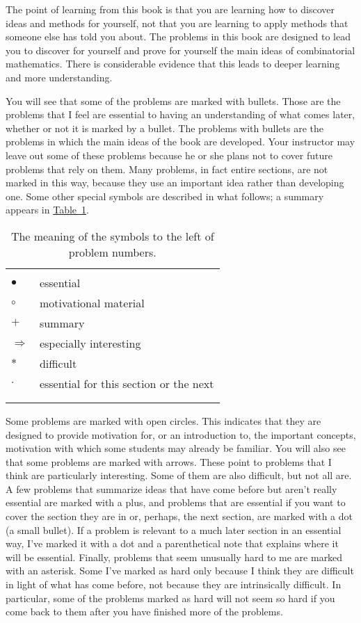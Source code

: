 \documentclass[10pt,]{book}
\theoremstyle{plain}
\theoremstyle{definition}
\numberwithin{equation}{chapter}
\newcommand{\hrulethin}  {\noalign{\hrule height 0.04em}}
\newcommand{\importantarrow}{$\Rightarrow$}
\begin{document}
\par
The point of learning from this book is that you are learning how to discover ideas and methods for yourself, not that you are learning to apply methods that someone else has told you about. The problems in this book are designed to lead you to discover for yourself and prove for yourself the main ideas of combinatorial mathematics.  There is considerable evidence that this leads to deeper learning and more understanding.%
\par
You will see that some of the problems are marked with bullets. Those are the problems that I feel are essential to having an understanding of what comes later, whether or not it is marked by a bullet. The problems with bullets are the problems in which the main ideas of the book are developed. Your instructor may leave out some of these problems because he or she plans not to cover future problems that rely on them. Many problems, in fact entire sections, are not marked in this way, because they use an important idea rather than developing one. Some other special symbols are described in what follows; a summary appears in \hyperref[tab_prob-symbs-pref]{Table~\ref{tab_prob-symbs-pref}}.%
\begin{table}
\centering
\begin{tabular}{ll}
&\tabularnewline\hrulethin
\(\bullet\)&essential\tabularnewline[0pt]
\(\circ\)&motivational material\tabularnewline[0pt]
\(+\)&summary\tabularnewline[0pt]
\importantarrow&especially interesting\tabularnewline[0pt]
\(*\)&difficult\tabularnewline[0pt]
\(\cdot\)&essential for this section or the next\tabularnewline[0pt]
&\tabularnewline\hrulethin
\end{tabular}
\caption{The meaning of the symbols to the left of problem numbers.\label{tab_prob-symbs-pref}}
\end{table}
Some problems are marked with open circles. This indicates that they are designed to provide motivation for, or an introduction to, the important concepts, motivation with which some students may already be familiar. You will also see that some problems are marked with arrows. These point to problems that I think are particularly interesting. Some of them are also difficult, but not all are. A few problems that summarize ideas that have come before but aren't really essential are marked with a plus, and problems that are essential if you want to cover the section they are in or, perhaps, the next section, are marked with a dot (a small bullet). If a problem is relevant to a much later section in an essential way, I've marked it with a dot and a parenthetical note that explains where it will be essential. Finally, problems that seem unusually hard to me are marked with an asterisk. Some I've marked as hard only because I think they are difficult in light of what has come before, not because they are intrinsically difficult. In particular, some of the problems marked as hard will not seem so hard if you come back to them after you have finished more of the problems.%
\end{document}
